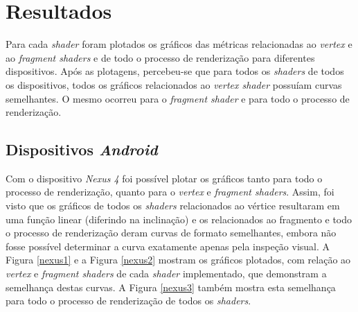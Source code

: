 \chapter[Resultados]{Resultados}
\label{result}

	Para cada \textit{shader} foram plotados os gráficos das métricas relacionadas ao \textit{vertex} e ao \textit{fragment shaders} e de todo o processo de renderização para diferentes dispositivos. Após as plotagens, percebeu-se que para todos os \textit{shaders} de todos os dispositivos, todos os gráficos relacionados ao \textit{vertex shader} possuíam curvas semelhantes. O mesmo ocorreu para o \textit{fragment shader} e para todo o processo de renderização.

\section{Dispositivos \textit{Android}} 

	Com o dispositivo \textit{Nexus 4} foi possível plotar os gráficos tanto para todo o processo de renderização, quanto para o \textit{vertex} e \textit{fragment shaders}. Assim, foi visto que os gráficos de todos os \textit{shaders} relacionados ao vértice resultaram em uma função linear (diferindo na inclinação)  e os relacionados ao fragmento e todo o processo de renderização deram curvas de formato semelhantes, embora não fosse possível determinar a curva exatamente apenas pela inspeção visual.  A Figura \ref{nexus1} e a Figura \ref{nexus2} mostram os gráficos plotados, com relação ao \textit{vertex} e \textit{fragment shaders} de cada \textit{shader} implementado, que demonstram a semelhança destas curvas. A Figura \ref{nexus3} também mostra esta semelhança para todo o processo de renderização de todos os \textit{shaders}.


